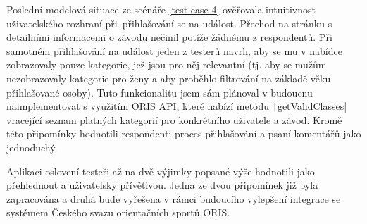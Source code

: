 Poslední modelová situace ze scénáře \ref{test-case-4} ověřovala intuitivnost uživatelského rozhraní při~přihlašování se na událost. Přechod na stránku s detailními informacemi o závodu nečinil potíže žádnému z respondentů. Při samotném přihlašování na událost jeden z testerů navrh, aby se mu v nabídce zobrazovaly pouze kategorie, jež jsou pro něj relevantní (tj. aby se mužům nezobrazovaly kategorie pro ženy a aby proběhlo filtrování na základě věku přihlašované osoby). Tuto funkcionalitu jsem sám plánoval v budoucnu naimplementovat s využitím ORIS API, které nabízí metodu \texttt|getValidClasses| vracející seznam platných kategorií pro konkrétního uživatele a závod. Kromě této připomínky hodnotili respondenti proces přihlašování a psaní komentářů jako jednoduchý.

Aplikaci oslovení testeři až na dvě výjimky popsané výše hodnotili jako přehlednout a uživatelsky přívětivou. Jedna ze dvou připomínek již byla zapracována a druhá bude vyřešena v rámci budoucího vylepšení integrace se systémem Českého svazu orientačních sportů ORIS.
